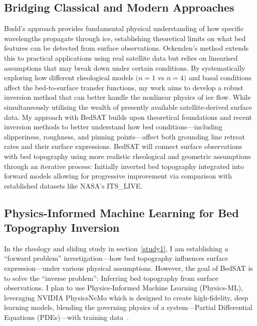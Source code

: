 \subsection{Bridging Classical and Modern Approaches}
Budd's approach provides fundamental physical understanding of how specific wavelengths propagate through ice, establishing theoretical limits on what bed features can be detected from surface observations. Ockenden's method extends this to practical applications using real satellite data but relies on linearised assumptions that may break down under certain conditions. By systematically exploring how different rheological models $(n = 1$ vs $n = 4)$ and basal conditions affect the bed-to-surface transfer functions, my work aims to develop a robust inversion method that can better handle the nonlinear physics of ice flow.
While simultaneously utilising the wealth of presently available satellite-derived surface data. My approach with BedSAT builds upon theoretical foundations and recent inversion methods to better understand how bed conditions—including slipperiness, roughness, and pinning points—affect both grounding line retreat rates and their surface expressions. BedSAT will connect surface observations with bed topography using more realistic rheological and geometric assumptions through an iterative process: Initially inverted bed topography integrated into forward models allowing for progressive improvement via comparison with established datasets like NASA's ITS\_LIVE.

\subsection{Physics-Informed Machine Learning for Bed Topography Inversion}\label{ML}
In the rheology and sliding study in section~\ref{study1}, I am establishing a ``forward problem'' investigation—how bed topography influences surface expression—under various physical assumptions. However, the goal of BedSAT is to solve the ``inverse problem'': Inferring bed topography from surface observations. I plan to use Physics-Informed Machine Learning (Physics-ML), leveraging NVIDIA PhysicsNeMo which is designed to create high-fidelity, deep learning models, blending the governing physics of a system—Partial Differential Equations (PDEs)—with training data~\cite{NVIDIA_NeMo_2025}. 

